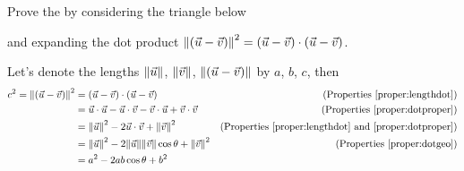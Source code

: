 \begin{exmp}
Prove the  by considering the triangle below
\begin{center}
\end{center}
and expanding the dot product $\norm{(\vec{u}-\vec{v})}^2 = (\vec{u}-\vec{v}) \cdot (\vec{u}-\vec{v})$.    
\end{exmp}
\begin{solution}
Let's denote the lengths $\norm{\vec{u}}$, $\norm{\vec{v}}$, $\norm{(\vec{u}-\vec{v})}$ by $a$, $b$, $c$, then
\begin{align*}
c^2 = \norm{(\vec{u}-\vec{v})}^2 &= (\vec{u}-\vec{v}) \cdot (\vec{u}-\vec{v}) & \text{(Properties \ref{proper:lengthdot})} \\
&= \vec{u} \cdot \vec{u} - \vec{u} \cdot \vec{v} - \vec{v} \cdot \vec{u} + \vec{v} \cdot \vec{v} & \text{(Properties \ref{proper:dotproper})} \\
&= \norm{\vec{u}}^2 - 2\vec{u} \cdot \vec{v} + \norm{\vec{v}}^2 & \text{(Properties \ref{proper:lengthdot} and \ref{proper:dotproper})} \\
&= \norm{\vec{u}}^2 - 2\norm{\vec{u}}\norm{\vec{v}}\cos\theta + \norm{\vec{v}}^2 & \text{(Properties \ref{proper:dotgeo})} \\
&= a^2 - 2ab\cos\theta + b^2
\end{align*}
\end{solution}

